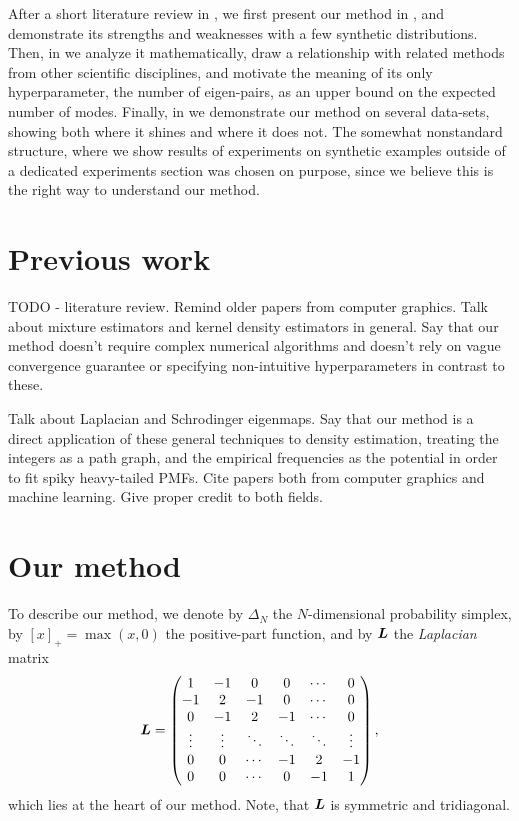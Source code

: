 \documentclass[10pt]{article} %
\begin{document}
After a short literature review in , we first present our method in , and demonstrate its strengths and weaknesses with a few synthetic distributions. Then, in  we analyze it mathematically, draw a relationship with related methods from other scientific disciplines, and motivate the meaning of its only hyperparameter, the number of eigen-pairs, as an upper bound on the expected number of modes. Finally, in  we demonstrate our method on several data-sets, showing both where it shines and where it does not. The somewhat nonstandard structure, where we show results of experiments on synthetic examples outside of a dedicated experiments section was chosen on purpose, since we believe this is the right way to understand our method.

\section{Previous work}\label{sec:review}
TODO - literature review. Remind older papers from computer graphics. Talk about mixture estimators and kernel density estimators in general. Say that our method doesn't require complex numerical algorithms and doesn't rely on vague convergence guarantee or specifying non-intuitive hyperparameters in contrast to these.

Talk about Laplacian and Schrodinger eigenmaps. Say that our method is a direct application of these general techniques to density estimation, treating the integers as a path graph, and the empirical frequencies as the potential in order to fit spiky heavy-tailed PMFs. Cite papers both from computer graphics and machine learning. Give proper credit to both fields.

\section{Our method}\label{sec:method}
To describe our method, we denote by $\Delta_N$ the $N$-dimensional probability simplex, by $[x]_+ = \max(x, 0)$ the positive-part function, and by ${\bm{L}}$ the \emph{Laplacian} matrix
\begin{equation}\label{eq:laplacian}
{\bm{L}} =\begin{pmatrix}
    1 & -1 & 0 & 0 & \cdots & 0 \\
    -1 & 2 & -1 & 0 & \cdots & 0 \\
    0 & -1 & 2 & -1 & \cdots & 0 \\
    \vdots & \vdots & \ddots & \ddots & \ddots & \vdots \\
    0 & 0 & \cdots & -1 & 2 & -1 \\
    0 & 0 & \cdots & 0 & -1 & 1
    \end{pmatrix},
\end{equation}
which lies at the heart of our method. Note, that ${\bm{L}}$ is symmetric and tridiagonal.
\end{document}
